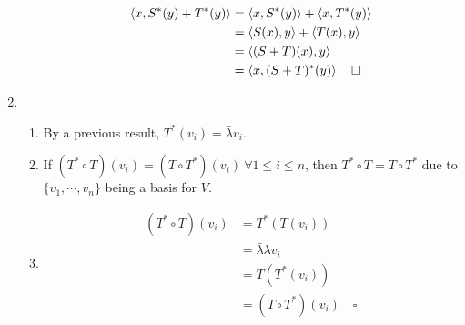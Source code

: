 \documentclass[12pt]{article}
\begin{document}
\begin{enumerate}
\begin{enumerate}
                        \begin{align*}
                              \braket{x, S^*(y)+T^*(y)} & = \braket{x, S^*(y)}+\braket{x, T^*(y)} \\
                                                        & = \braket{S(x), y}+\braket{T(x), y}     \\
                                                        & = \braket{(S+T)(x), y}                  \\
                                                        & = \braket{x, (S+T)^*(y)}\quad\square
                        \end{align*}
            \end{enumerate}

      \item \begin{enumerate}
                  \item By a previous result, $T^*(v_i)=\bar{\lambda} v_i$.
                  \item If $(T^* \circ T)(v_i)=(T \circ T^*)(v_i)\ \forall 1 \le i \le n$,
                        then $T^* \circ T=T \circ T^*$ due to $\{v_1, \cdots, v_n\}$ being a basis for $V$.
                  \item \begin{align*}
                              (T^* \circ T)(v_i) & = T^*(T(v_i))                    \\
                                                 & = \bar{\lambda}\lambda v_i       \\
                                                 & = T(T^*(v_i))                    \\
                                                 & = (T \circ T^*)(v_i)\quad\square
                        \end{align*}
            \end{enumerate}
\end{enumerate}
\end{document}
